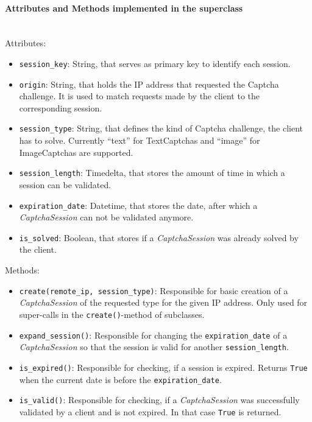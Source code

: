 \paragraph{Attributes and Methods implemented in the superclass} \mbox{} \\
Attributes:

\begin{itemize}
\item \verb|session_key|: String, that serves as primary key to identify each session. 
\item \verb|origin|: String, that holds the IP address that requested the Captcha challenge. It is used to match requests made by the client to the corresponding session.
\item \verb|session_type|: String, that defines the kind of Captcha challenge, the client has to solve. Currently ``text'' for TextCaptchas and ``image'' for ImageCaptchas are supported.
\item \verb|session_length|: Timedelta, that stores the amount of time in which a session can be validated.
\item \verb|expiration_date|: Datetime, that stores the date, after which a \emph{CaptchaSession} can not be validated anymore.
\item \verb|is_solved|: Boolean, that stores if a \emph{CaptchaSession} was already solved by the client.
\end{itemize}

Methods:

\begin{itemize} 
\item \verb|create(remote_ip, session_type)|: Responsible for basic creation of a \emph{CaptchaSession} of the requested type for the given IP address. Only used for super-calls in the \verb|create()|-method of subclasses.
\item \verb|expand_session()|: Responsible for changing the \verb|expiration_date| of a \emph{CaptchaSession} so that the session is valid for another \verb|session_length|.
\item \verb|is_expired()|: Responsible for checking, if a session is expired. Returns \verb|True| when the current date is before the \verb|expiration_date|.
\item \verb|is_valid()|: Responsible for checking, if a \emph{CaptchaSession} was successfully validated by a client and is not expired. In that case \verb|True| is returned.
\end{itemize}

